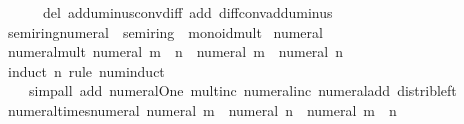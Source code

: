 \begin{isabellebody}
\ \ \ \ \ \ del{\isacharcolon}{\kern0pt}\ add{\isacharunderscore}{\kern0pt}uminus{\isacharunderscore}{\kern0pt}conv{\isacharunderscore}{\kern0pt}diff\ add{\isacharcolon}{\kern0pt}\ diff{\isacharunderscore}{\kern0pt}conv{\isacharunderscore}{\kern0pt}add{\isacharunderscore}{\kern0pt}uminus{\isacharparenright}{\kern0pt}%
\endisatagproof
{\isafoldproof}%
%
\isadelimproof
\isanewline
%
\endisadelimproof
\isanewline
{}\isamarkupfalse%
%
\isadelimdocument
%
\endisadelimdocument
%
\isatagdocument
%
\isamarkuptrue%
%
\endisatagdocument
{\isafolddocument}%
%
\isadelimdocument
%
\endisadelimdocument
{}\isamarkupfalse%
\ semiring{\isacharunderscore}{\kern0pt}numeral\ {\isacharequal}{\kern0pt}\ semiring\ {\isacharplus}{\kern0pt}\ monoid{\isacharunderscore}{\kern0pt}mult\isanewline
{}\isanewline
\isanewline
{}\isamarkupfalse%
\ numeral%
\isadelimproof
\ %
\endisadelimproof
%
\isatagproof
\isacommand{{\isachardot}{\kern0pt}{\isachardot}{\kern0pt}}\isamarkupfalse%
%
\endisatagproof
{\isafoldproof}%
%
\isadelimproof
%
\endisadelimproof
\isanewline
\isanewline
{}\isamarkupfalse%
\ numeral{\isacharunderscore}{\kern0pt}mult{\isacharcolon}{\kern0pt}\ {\isachardoublequoteopen}numeral\ {\isacharparenleft}{\kern0pt}m\ {\isacharasterisk}{\kern0pt}\ n{\isacharparenright}{\kern0pt}\ {\isacharequal}{\kern0pt}\ numeral\ m\ {\isacharasterisk}{\kern0pt}\ numeral\ n{\isachardoublequoteclose}\isanewline
%
\isadelimproof
\ \ %
\endisadelimproof
%
\isatagproof
{}\isamarkupfalse%
\ {\isacharparenleft}{\kern0pt}induct\ n\ rule{\isacharcolon}{\kern0pt}\ num{\isacharunderscore}{\kern0pt}induct{\isacharparenright}{\kern0pt}\isanewline
\ \ \ \ {\isacharparenleft}{\kern0pt}simp{\isacharunderscore}{\kern0pt}all\ add{\isacharcolon}{\kern0pt}\ numeral{\isacharunderscore}{\kern0pt}One\ mult{\isacharunderscore}{\kern0pt}inc\ numeral{\isacharunderscore}{\kern0pt}inc\ numeral{\isacharunderscore}{\kern0pt}add\ distrib{\isacharunderscore}{\kern0pt}left{\isacharparenright}{\kern0pt}%
\endisatagproof
{\isafoldproof}%
%
\isadelimproof
\isanewline
%
\endisadelimproof
\isanewline
{}\isamarkupfalse%
\ numeral{\isacharunderscore}{\kern0pt}times{\isacharunderscore}{\kern0pt}numeral{\isacharcolon}{\kern0pt}\ {\isachardoublequoteopen}numeral\ m\ {\isacharasterisk}{\kern0pt}\ numeral\ n\ {\isacharequal}{\kern0pt}\ numeral\ {\isacharparenleft}{\kern0pt}m\ {\isacharasterisk}{\kern0pt}\ n{\isacharparenright}{\kern0pt}{\isachardoublequoteclose}\isanewline

\end{isabellebody}
